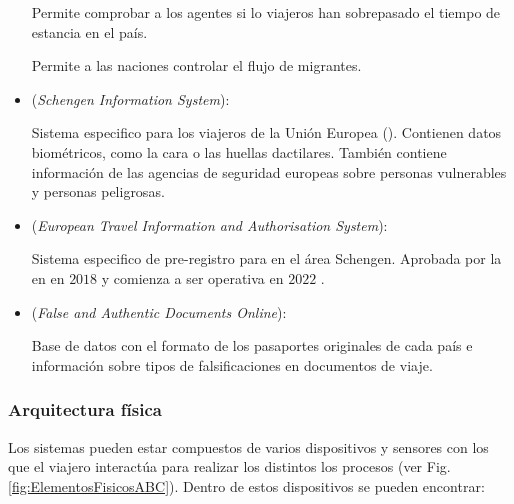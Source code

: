 \begin{itemize}
    Permite comprobar a los agentes si lo viajeros han sobrepasado el tiempo de estancia en el país.
    
    Permite a las naciones controlar el flujo de migrantes.
    
    \item 
    \textbf{} (\textit{Schengen Information System}):
    
    Sistema especifico para los viajeros de la Unión Europea (). Contienen datos biométricos, como la cara o las huellas dactilares. También contiene información de las agencias de seguridad europeas sobre personas vulnerables y personas peligrosas.  
    
    \item 
    \textbf{} (\textit{European Travel Information and Authorisation System}):
    
    Sistema especifico de pre-registro para  en el área \Gls{Schengen}. Aprobada por la en en $2018$ y comienza a ser operativa en $2022$ \cite{union2018directiveETIAS}.
    
    \item 
    \textbf{} (\textit{False and Authentic Documents Online}):
    
    Base de datos con el formato de los pasaportes originales de cada país e información sobre tipos de falsificaciones en documentos de viaje.
    
\end{itemize}

\subsubsection{Arquitectura física}\label{subsec:ArquitecturaFisicaABC}

Los sistemas  pueden estar compuestos de varios dispositivos y sensores con los que el viajero interactúa para realizar los distintos los procesos (ver Fig. \ref{fig:ElementosFisicosABC}). Dentro de estos dispositivos se pueden encontrar:

